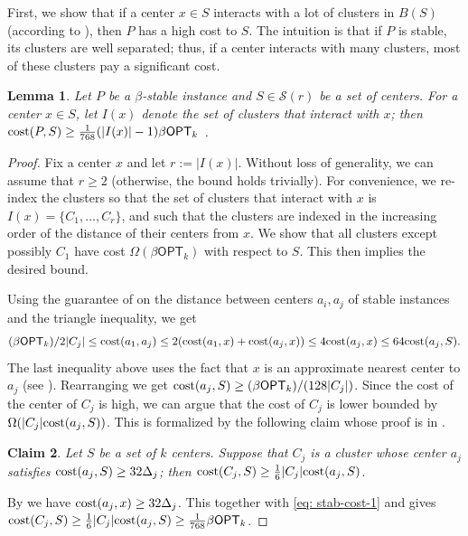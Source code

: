 \documentclass[11pt]{article}
\newtheorem{lemma}{Lemma}[section]
\newtheorem{claim}[lemma]{Claim}
\theoremstyle{restate}
\theoremstyle{definition}
\newcommand{\cost}{\textnormal{cost}}
\newcommand{\opt}{\ensuremath{\mathsf{OPT}}}
\begin{document}
First, we show that if a center $x\in S$   interacts with a lot of clusters in $B(S)$ (according to ), then $P$ has a high cost to $S$. The intuition is that if $P$ is stable, its clusters are well separated; thus, if a center interacts with many clusters, most of these clusters pay a significant cost.
\begin{lemma}\label{lem: cost-increase}
	Let $P$ be a $\beta$-stable instance and $S\in \mathcal S(r)$ be a set of centers.
    For a center $x \in S$, 
    let $I(x)$ denote the set of clusters that interact with $x$; then $\cost(P,S) \geq \tfrac{1}{768} (|I(x)|-1) \beta \opt_k$ . 
\end{lemma}
\begin{proof}
	Fix a center $x$ and let $r:= |I(x)|$. Without loss of generality, we can assume that $r \geq 2$ (otherwise, the bound holds trivially). For convenience, we re-index the clusters so that the set of clusters that interact with $x$ is $I(x) = \{C_{1}, \ldots, C_{r}\}$, and such that the clusters are indexed in the increasing order of the distance of their centers from $x$. 
    We show that all clusters except possibly $C_{1}$ have cost $\Omega(\beta \opt_k)$ with respect to $S$. This then implies the desired bound.

Using the guarantee of  on the distance between centers $a_i, a_j$ of stable instances and the triangle inequality, we get	\begin{align}\label{eq: stab-cost-1}
		(\beta \opt_k)/2|C_{j}| \leq \cost(a_{1}, a_{j}) 
        \leq 2(\cost(a_{1}, x) + \cost(a_{j},x)) 
        \leq 4\cost(a_j,x) 
        \leq  64\cost(a_j,S).
	\end{align}	
	The last inequality above uses the fact that $x$ is an approximate nearest center to $a_j$ (see ). Rearranging we get $\cost(a_j,S) \geq (\beta \opt_k)/(128 |C_j|)$. Since the cost of the center of $C_j$ is high, we can argue that the cost of $C_j$ is lower bounded by $\Omega(|C_j| \cost(a_j, S))$. This is formalized by the following claim whose proof is in .

\begin{claim}\label{lem: cost-from-center}
    Let $S$ be a set of $k$ centers. Suppose that $C_j$ is a cluster whose center $a_j$ satisfies $\cost(a_j,S) \geq 32\Delta_j$; then $\cost(C_j,S) \geq \tfrac{1}{6}  |C_j| \cost(a_j,S)$.
\end{claim}


    
 
 
 
 By  we have $\cost(a_j,x) \geq 32 \Delta_j$. This together with \eqref{eq: stab-cost-1} and  gives $\cost(C_j,S) \geq \tfrac{1}{6} |C_j| \cost(a_j,S) \geq \tfrac{1}{768} \beta \opt_k$.\qedhere
\end{proof}
\end{document}
